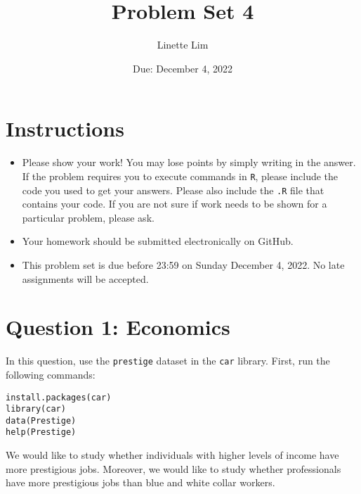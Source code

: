 \documentclass[12pt,letterpaper]{article}
\title{Problem Set 4}
\date{Due: December 4, 2022}
\author{Linette Lim}
\begin{document}
	\maketitle
	\section*{Instructions}
	\begin{itemize}
		\item Please show your work! You may lose points by simply writing in the answer. If the problem requires you to execute commands in \texttt{R}, please include the code you used to get your answers. Please also include the \texttt{.R} file that contains your code. If you are not sure if work needs to be shown for a particular problem, please ask.
		\item Your homework should be submitted electronically on GitHub.
		\item This problem set is due before 23:59 on Sunday December 4, 2022. No late assignments will be accepted.
	\end{itemize}



	\vspace{.5cm}
\section*{Question 1: Economics}
\vspace{.25cm}
\noindent 	
In this question, use the \texttt{prestige} dataset in the \texttt{car} library. First, run the following commands:

\begin{verbatim}
install.packages(car)
library(car)
data(Prestige)
help(Prestige)
\end{verbatim} 


\noindent We would like to study whether individuals with higher levels of income have more prestigious jobs. Moreover, we would like to study whether professionals have more prestigious jobs than blue and white collar workers.
\end{document}
